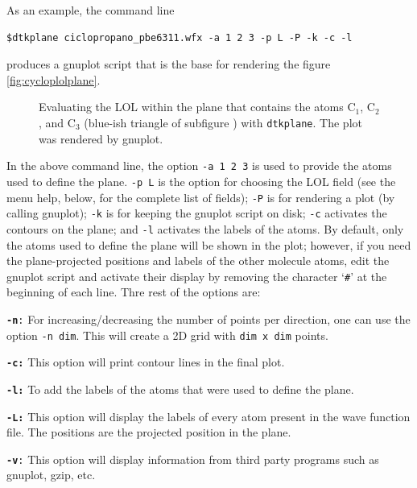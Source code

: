 As an example, the command line
\begin{lstlisting}
$dtkplane ciclopropano_pbe6311.wfx -a 1 2 3 -p L -P -k -c -l
\end{lstlisting}
produces a gnuplot script that is the base for rendering the figure \ref{fig:cycloplolplane}. 
%
\begin{figure}[h!]
\centering
{}\qquad\qquad%
\caption{Evaluating the LOL within the plane that contains the atoms C$_1$, C$_2$,
 and C$_3$ (blue-ish triangle of subfigure ) with \texttt{dtkplane}. The plot  was rendered by gnuplot.}\label{fig:dtkplaneuseex}
\end{figure}
%

In the above command line, the option \texttt{-a 1 2 3} is used to provide the atoms
used to define the plane. \texttt{-p L} is the option for choosing the LOL field
(see the menu help, below, for the complete list of fields); \texttt{-P} is for
rendering a plot (by calling gnuplot); \texttt{-k} is for keeping the gnuplot
script on disk; \texttt{-c} activates the contours on the plane; and \texttt{-l}
activates the labels of the atoms. By default, only the atoms used to define the plane
will be shown in the plot; however, if you need the plane-projected positions and labels of
the other molecule atoms, edit the gnuplot script and activate their display by
removing the character `\texttt{\#}' at the beginning of each line. Thre rest of the
options are:

\texttt{\textbf{-n}:} For increasing/decreasing the number of points per direction, one can use the option \texttt{-n dim}. This will create a 2D grid with \texttt{dim x dim} points.

\texttt{\textbf{-c:}} This option will print contour lines in the final plot.

\texttt{\textbf{-l:}} To add the labels of the atoms that were used to define the plane.

\texttt{\textbf{-L:}} This option will display the labels of every atom present in the wave function file. The positions are the projected position in the plane.

\texttt{\textbf{-v}:} This option will display information from third party programs such as gnuplot, gzip, etc.

